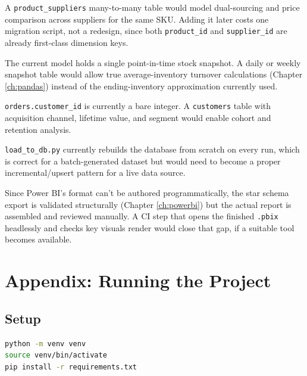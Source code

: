 \documentclass[11pt,a4paper]{report}
\begin{document}
\begin{description}[leftmargin=1.4em, style=nextline]
  \item[Multi-supplier bridge table.] A \texttt{product\_suppliers}
    many-to-many table would model dual-sourcing and price comparison
    across suppliers for the same SKU. Adding it later costs one migration
    script, not a redesign, since both \texttt{product\_id} and
    \texttt{supplier\_id} are already first-class dimension keys.
  \item[Historical inventory snapshots.] The current model holds a single
    point-in-time stock snapshot. A daily or weekly snapshot table would
    allow true average-inventory turnover calculations (Chapter
    \ref{ch:pandas}) instead of the ending-inventory approximation
    currently used.
  \item[Real customer dimension.] \texttt{orders.customer\_id} is currently
    a bare integer. A \texttt{customers} table with acquisition channel,
    lifetime value, and segment would enable cohort and retention analysis.
  \item[Incremental ETL.] \texttt{load\_to\_db.py} currently rebuilds the
    database from scratch on every run, which is correct for a
    batch-generated dataset but would need to become a proper
    incremental/upsert pattern for a live data source.
  \item[Automated \texttt{.pbix} smoke test.] Since Power BI's format can't
    be authored programmatically, the star schema export is validated
    structurally (Chapter \ref{ch:powerbi}) but the actual report is
    assembled and reviewed manually. A CI step that opens the finished
    \texttt{.pbix} headlessly and checks key visuals render would close
    that gap, if a suitable tool becomes available.
\end{description}

\chapter{Appendix: Running the Project}

\section{Setup}
\begin{lstlisting}[language=bash]
python -m venv venv
source venv/bin/activate
pip install -r requirements.txt
\end{lstlisting}
\end{document}
